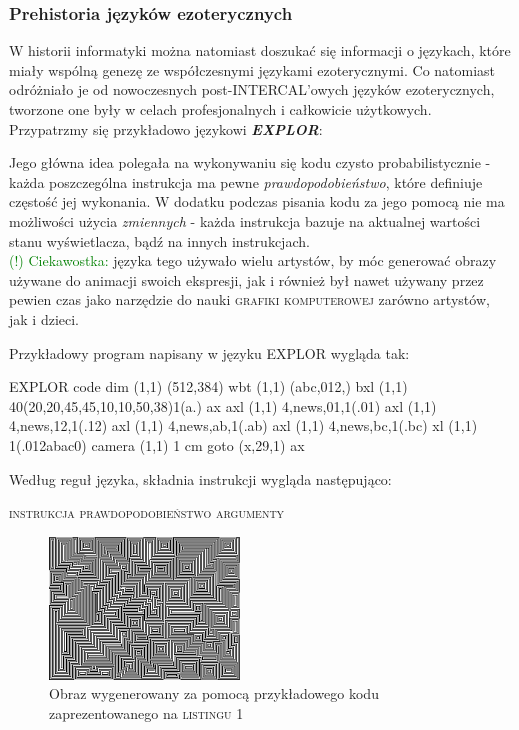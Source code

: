\documentclass[fleqn,10pt]{SelfArx} %
\begin{document}
\subsubsection{Prehistoria języków ezoterycznych}
W historii informatyki można natomiast doszukać się informacji o językach, 
które miały wspólną genezę ze współczesnymi językami
ezoterycznymi. Co natomiast odróżniało je od nowoczesnych post-INTERCAL'owych języków ezoterycznych, 
tworzone one były w celach profesjonalnych i całkowicie użytkowych.
Przypatrzmy się przykładowo językowi \textbf{\textit{EXPLOR}}: 
\begin{adjustwidth}{1cm}{0cm}
	Jego główna idea polegała na wykonywaniu się kodu czysto probabilistycznie - każda poszczególna instrukcja ma pewne \textit{prawdopodobieństwo}, 
	które definiuje częstość jej wykonania. W dodatku podczas pisania kodu za jego pomocą nie ma możliwości użycia
	\textit{zmiennych} - każda instrukcja bazuje na aktualnej wartości stanu wyświetlacza, bądź na innych instrukcjach.
	\\\textcolor{green}{(!) Ciekawostka:} języka tego używało wielu artystów, by móc generować obrazy używane do animacji swoich ekspresji, 
	jak i również był nawet używany przez pewien czas jako narzędzie do nauki \textsc{grafiki komputerowej} zarówno artystów, jak i dzieci.
\end{adjustwidth}
Przykładowy program napisany w języku EXPLOR wygląda tak:
\begin{sexylisting}{EXPLOR code}
  dim    (1,1)    (512,384)
  wbt    (1,1)    (abc,012,)
  bxl    (1,1)    40(20,20,45,45,10,10,50,38)1(a.)
ax axl   (1,1)    4,news,01,1(.01)
  axl    (1,1)    4,news,12,1(.12)
  axl    (1,1)    4,news,ab,1(.ab)
  axl    (1,1)    4,news,bc,1(.bc)
  xl     (1,1)    1(.012abac0)
  camera (1,1)    1
cm goto  (x,29,1) ax
\end{sexylisting}
	Według reguł języka, składnia instrukcji wygląda następująco:
	\begin{center}
		\textsc{instrukcja prawdopodobieństwo argumenty}
	\end{center}
\begin{figure}[H] %
	\centering %
	\includegraphics[width=0.45\textwidth]{Figures/Explor_example.png} %
	\caption{Obraz wygenerowany za pomocą przykładowego kodu zaprezentowanego na \textsc{listingu 1}}
\end{figure}
\end{document}
